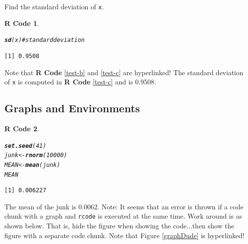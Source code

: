 \documentclass{article}\usepackage[]{graphicx}\usepackage[]{color}
\makeatletter
\newcommand{\hlnum}[1]{\textcolor[rgb]{0.686,0.059,0.569}{#1}}%
\newcommand{\hlcom}[1]{\textcolor[rgb]{0.678,0.584,0.686}{\textit{#1}}}%
\newcommand{\hlstd}[1]{\textcolor[rgb]{0.345,0.345,0.345}{#1}}%
\newcommand{\hlkwb}[1]{\textcolor[rgb]{0.69,0.353,0.396}{#1}}%
\newcommand{\hlkwd}[1]{\textcolor[rgb]{0.737,0.353,0.396}{\textbf{#1}}}%
\newenvironment{kframe}{%
 \def\at@end@of@kframe{}%
 \ifinner\ifhmode%
  \def\at@end@of@kframe{\end{minipage}}%
  \begin{minipage}{\columnwidth}%
 \fi\fi%
 \def\FrameCommand##1{\hskip\@totalleftmargin \hskip-\fboxsep
 \colorbox{shadecolor}{##1}\hskip-\fboxsep
     \hskip-\linewidth \hskip-\@totalleftmargin \hskip\columnwidth}%
 \MakeFramed {\advance\hsize-\width
   \@totalleftmargin\z@ \linewidth\hsize
   \@setminipage}}%
 {\par\unskip\endMakeFramed%
 \at@end@of@kframe}
\newenvironment{knitrout}{}{} %
\theoremstyle{rcode}
\newtheorem{rcode}{R Code}[section]
\newcommand{\noind}{\setlength{\parindent}{0pt}}
\makeatother
\begin{document}
\noind
Find the standard deviation of \texttt{x}.

\begin{knitrout}
\color{fgcolor}\begin{kframe}
\begin{rcode}\label{test-c}\hfill{}\begin{alltt}
\hlkwd{sd}\hlstd{(x)}  \hlcom{# standard deviation   }
\end{alltt}
\begin{verbatim}
[1] 0.9508
\end{verbatim}
\end{rcode}\end{kframe}
\end{knitrout}


Note that \textbf{R Code} \vref{test-b} and \vref{test-c} are hyperlinked!  The standard deviation of \texttt{x} is computed in \textbf{R Code} \vref{test-c} and is 0.9508.

\clearpage
\subsection{Graphs and Environments}

\begin{knitrout}
\color{fgcolor}\begin{kframe}
\begin{rcode}\label{plot1}\hfill{}\begin{alltt}
\hlkwd{set.seed}\hlstd{(}\hlnum{41}\hlstd{)}
\hlstd{junk} \hlkwb{<-} \hlkwd{rnorm}\hlstd{(}\hlnum{10000}\hlstd{)}
\hlstd{MEAN} \hlkwb{<-} \hlkwd{mean}\hlstd{(junk)}
\hlstd{MEAN}
\end{alltt}
\begin{verbatim}
[1] 0.006227
\end{verbatim}
\end{rcode}\end{kframe}
\end{knitrout}


The mean of the junk is 0.0062.  Note: It seems that an error is thrown if
a code chunk with a graph and \texttt{rcode} is executed at the same time.  Work around is
as shown below.  That is, hide the figure when showing the code...then show the figure
with a separate code chunk.  Note that Figure \vref{graphDude} is hyperlinked!
\end{document}
